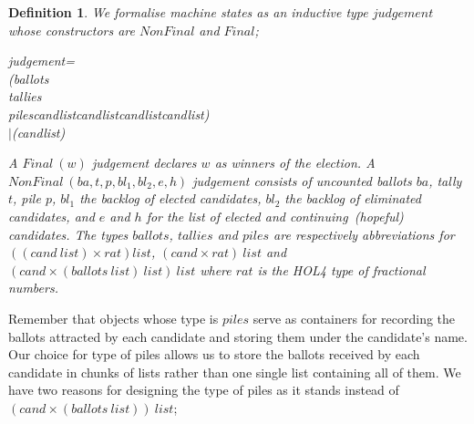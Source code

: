 \documentclass[10pt,conference]{IEEEtran}
\renewcommand{\HOLConst}[1]{{\textsf{\upshape #1}}}
\renewcommand{\HOLTyOp}[1]{\textsf{\itshape #1}}
\renewcommand{\HOLTokenBar}{\ensuremath{\mathtt{|}}}
\newtheorem{definition}{Definition}
\begin{document}
\begin{definition}\label{judgement}
We formalise machine states as an inductive type  $\mathit{judgement}$ whose constructors are  $\mathit{NonFinal}$ and $\mathit{Final}$; 
\begin{holthmenv}
\HOLTyOp{judgement}\;=\\
\;\;\;\;\HOLConst{NonFinal}\;(\HOLTyOp{ballots}\;\HOLTokenProd{}\\
\;\;\;\;\;\HOLTyOp{tallies}\;\HOLTokenProd{}\\
\;\;\;\;\;\HOLTyOp{piles}\;\HOLTokenProd{}\;\HOLTyOp{cand}\;\HOLTyOp{list}\;\HOLTokenProd{}\;\HOLTyOp{cand}\;\HOLTyOp{list}\;\HOLTokenProd{}\;\HOLTyOp{cand}\;\HOLTyOp{list}\;\HOLTokenProd{}\;\HOLTyOp{cand}\;\HOLTyOp{list})\\
\;\;\HOLTokenBar{}\;\HOLConst{Final}\;(\HOLTyOp{cand}\;\HOLTyOp{list})
\end{holthmenv}

 A $\mathit{Final~(w)}$ judgement declares $w$ as winners of the election. A  $\mathit{NonFinal~(ba,t,p,bl_{1},bl_{2},e,h)}$ judgement  consists of uncounted ballots $ba$, tally $t$, pile $p$, $bl_{1}$ the backlog of elected candidates, $bl_{2}$ the backlog of eliminated candidates, and $e$ and $h$ for the list of elected and continuing~(hopeful) candidates. The types  $\mathit{ballots}$, $\mathit{tallies}$ and $\mathit{piles}$ are respectively abbreviations for  $\mathit{((cand ~list)\times rat) list}$,   $\mathit{(cand\times rat)~list}$ and $\mathit{(cand\times(ballots~list)~list) ~list}$ where $\mathit{rat}$ is the HOL4 type of fractional numbers.
\end{definition}
 Remember that objects whose type is $\mathit{piles}$ serve as containers for recording the ballots attracted by each candidate and storing them under the candidate's name. Our choice for type of piles allows us to store the ballots received by each candidate in chunks of lists rather than one single list containing all of them.  We have two reasons for designing the type of piles as it stands instead of $\mathit{(cand\times(ballots~list))~list}$;  
\end{document}
